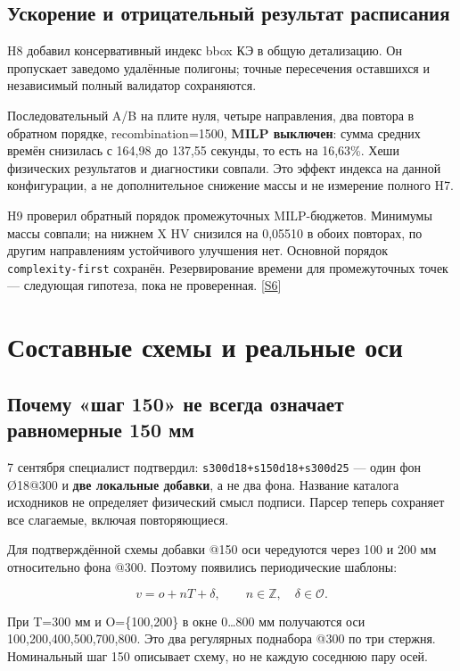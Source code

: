 \documentclass[11pt,a4paper]{article}
\begin{document}
\subsection{Ускорение и отрицательный результат расписания}

H8 добавил консервативный индекс bbox КЭ в общую детализацию. Он пропускает заведомо удалённые полигоны; точные пересечения оставшихся и независимый полный валидатор сохраняются.


Последовательный A/B на плите нуля, четыре направления, два повтора в обратном порядке, recombination=1500, \textbf{MILP выключен}: сумма средних времён снизилась с 164,98 до 137,55 секунды, то есть на 16,63\%. Хеши физических результатов и диагностики совпали. Это эффект индекса на данной конфигурации, а не дополнительное снижение массы и не измерение полного H7.


H9 проверил обратный порядок промежуточных MILP-бюджетов. Минимумы массы совпали; на нижнем X HV снизился на 0,05510 в обоих повторах, по другим направлениям устойчивого улучшения нет. Основной порядок {\small\nolinkurl{complexity-first}} сохранён. Резервирование времени для промежуточных точек — следующая гипотеза, пока не проверенная. {\color{Teal}\small[\hyperlink{S6}{S6}]}


\section{Составные схемы и реальные оси}

\subsection{Почему «шаг 150» не всегда означает равномерные 150 мм}

7 сентября специалист подтвердил: {\small\nolinkurl{s300d18+s150d18+s300d25}} — один фон Ø18@300 и \textbf{две локальные добавки}, а не два фона. Название каталога исходников не определяет физический смысл подписи. Парсер теперь сохраняет все слагаемые, включая повторяющиеся.


Для подтверждённой схемы добавки @150 оси чередуются через 100 и 200 мм относительно фона @300. Поэтому появились периодические шаблоны:


\[
v=o+nT+\delta,\qquad n\in\mathbb Z,\quad\delta\in\mathcal O.
\]

При T=300 мм и O=\{100,200\} в окне 0…800 мм получаются оси 100,200,400,500,700,800. Это два регулярных поднабора @300 по три стержня. Номинальный шаг 150 описывает схему, но не каждую соседнюю пару осей.
\end{document}
